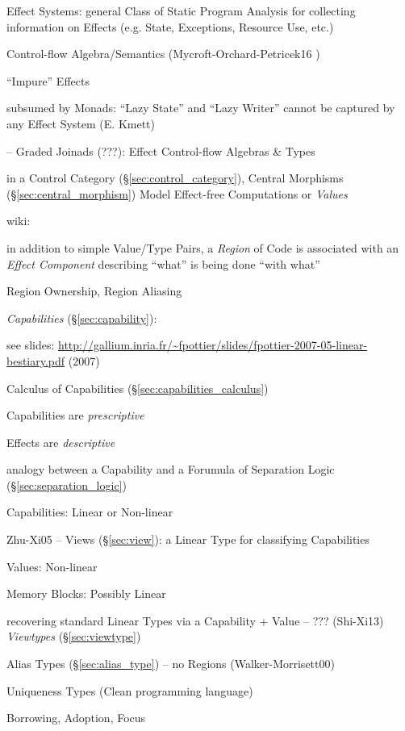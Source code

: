 Effect Systems: general Class of Static Program Analysis for
collecting information on Effects (e.g. State, Exceptions, Resource
Use, etc.) \cite{orchard-yoshida16}

Control-flow Algebra/Semantics (Mycroft-Orchard-Petricek16
\cite{mycroft-orchard-petricek16})

``Impure'' Effects

subsumed by Monads: ``Lazy State'' and ``Lazy Writer'' cannot be
captured by any Effect System (E. Kmett)

\cite{mycroft-orchard-petricek16} -- Graded Joinads (???): Effect
Control-flow Algebras \& Types

in a Control Category (\S\ref{sec:control_category}), Central
Morphisms (\S\ref{sec:central_morphism}) Model Effect-free
Computations or \emph{Values} %

wiki:

in addition to simple Value/Type Pairs, a \emph{Region} of Code is
associated with an \emph{Effect Component} describing ``what'' is
being done ``with what''

Region Ownership, Region Aliasing


\emph{Capabilities} (\S\ref{sec:capability}):

\fist see slides:
\url{http://gallium.inria.fr/~fpottier/slides/fpottier-2007-05-linear-bestiary.pdf}
(2007)

Calculus of Capabilities (\S\ref{sec:capabilities_calculus})

Capabilities are \emph{prescriptive}

Effects are \emph{descriptive}

analogy between a Capability and a Forumula of Separation Logic
(\S\ref{sec:separation_logic})

Capabilities: Linear or Non-linear

Zhu-Xi05 -- Views (\S\ref{sec:view}): a Linear Type for classifying
Capabilities

Values: Non-linear

Memory Blocks: Possibly Linear

recovering standard Linear Types via a Capability + Value --
??? (Shi-Xi13) \emph{Viewtypes} (\S\ref{sec:viewtype})

Alias Types (\S\ref{sec:alias_type}) -- no Regions
(Walker-Morrisett00)

Uniqueness Types (Clean programming language)

Borrowing, Adoption, Focus %


